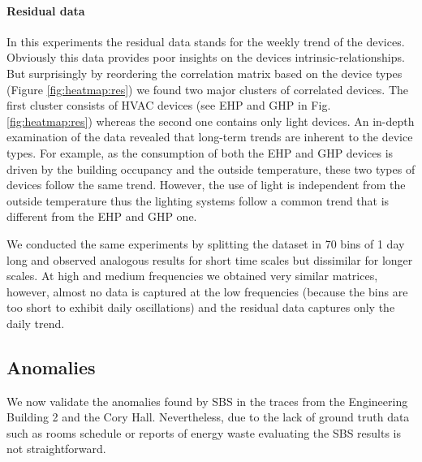 \paragraph{Residual data}
In this experiments the residual data stands for the weekly trend of the devices.
Obviously this data provides poor insights on the devices intrinsic-relationships.
But surprisingly by reordering the correlation matrix based on the device types (Figure \ref{fig:heatmap:res}) we found two major clusters of correlated devices.
The first cluster consists of HVAC devices (see EHP and GHP in Fig. \ref{fig:heatmap:res}) whereas the second one contains only light devices. 
An in-depth examination of the data revealed that long-term trends are inherent to the device types. 
For example, as the consumption of both the EHP and GHP devices is driven by the building occupancy and the outside temperature, these two types of devices follow the same trend. 
However, the use of light is independent from the outside temperature thus the lighting systems follow a common trend that is different from the EHP and GHP one.

We conducted the same experiments by splitting the dataset in 70 bins of 1 day long and observed analogous results for short time scales but dissimilar for longer scales.
At high and medium frequencies we obtained very similar matrices, however, almost no data is captured at the low frequencies (because the bins are too short to exhibit daily oscillations) and the residual data captures only the daily trend.


\subsection{Anomalies}
We now validate the anomalies found by SBS in the traces from the Engineering Building 2 and the Cory Hall.
Nevertheless, due to the lack of ground truth data such as rooms schedule or reports of energy waste evaluating the SBS results is not straightforward.

